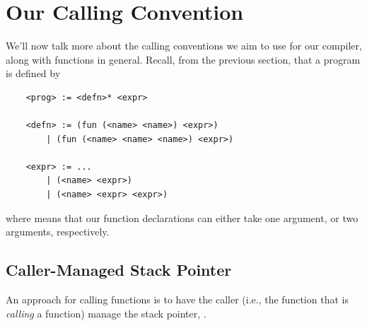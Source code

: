 \documentclass[letterpaper]{article}
\begin{document}
\section{Our Calling Convention}
We'll now talk more about the calling conventions we aim to use for our compiler, along with functions in general. Recall, from the previous section, that a  program is defined by 
\begin{verbatim}
    <prog> := <defn>* <expr>

    <defn> := (fun (<name> <name>) <expr>)
        | (fun (<name> <name> <name>) <expr>)

    <expr> := ... 
        | (<name> <expr>) 
        | (<name> <expr> <expr>)\end{verbatim}
where  means that our function declarations can either take one argument, or two arguments, respectively.

\subsection{Caller-Managed Stack Pointer}
An approach for calling functions is to have the caller (i.e., the function that is \emph{calling} a function) manage the stack pointer, .
\end{document}
